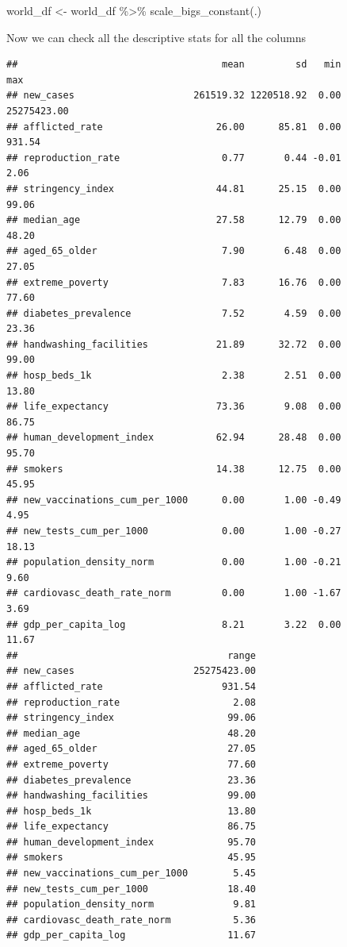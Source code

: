 \documentclass[11pt,preprint, authoryear]{elsarticle}
\numberwithin{equation}{section}
\numberwithin{figure}{section}
\numberwithin{table}{section}
\newenvironment{Shaded}{\begin{snugshade}}{\end{snugshade}}
\newcommand{\FunctionTok}[1]{\textcolor[rgb]{0.00,0.00,0.00}{#1}}
\newcommand{\NormalTok}[1]{#1}
\newcommand{\OtherTok}[1]{\textcolor[rgb]{0.56,0.35,0.01}{#1}}
\newcommand{\SpecialCharTok}[1]{\textcolor[rgb]{0.00,0.00,0.00}{#1}}
\begin{document}
\begin{Shaded}
\begin{Highlighting}[]
\NormalTok{world\_df }\OtherTok{\textless{}{-}}\NormalTok{ world\_df }\SpecialCharTok{\%\textgreater{}\%} \FunctionTok{scale\_bigs\_constant}\NormalTok{(.)}
\end{Highlighting}
\end{Shaded}

Now we can check all the descriptive stats for all the columns

\begin{verbatim}
##                                    mean         sd   min         max
## new_cases                     261519.32 1220518.92  0.00 25275423.00
## afflicted_rate                    26.00      85.81  0.00      931.54
## reproduction_rate                  0.77       0.44 -0.01        2.06
## stringency_index                  44.81      25.15  0.00       99.06
## median_age                        27.58      12.79  0.00       48.20
## aged_65_older                      7.90       6.48  0.00       27.05
## extreme_poverty                    7.83      16.76  0.00       77.60
## diabetes_prevalence                7.52       4.59  0.00       23.36
## handwashing_facilities            21.89      32.72  0.00       99.00
## hosp_beds_1k                       2.38       2.51  0.00       13.80
## life_expectancy                   73.36       9.08  0.00       86.75
## human_development_index           62.94      28.48  0.00       95.70
## smokers                           14.38      12.75  0.00       45.95
## new_vaccinations_cum_per_1000      0.00       1.00 -0.49        4.95
## new_tests_cum_per_1000             0.00       1.00 -0.27       18.13
## population_density_norm            0.00       1.00 -0.21        9.60
## cardiovasc_death_rate_norm         0.00       1.00 -1.67        3.69
## gdp_per_capita_log                 8.21       3.22  0.00       11.67
##                                     range
## new_cases                     25275423.00
## afflicted_rate                     931.54
## reproduction_rate                    2.08
## stringency_index                    99.06
## median_age                          48.20
## aged_65_older                       27.05
## extreme_poverty                     77.60
## diabetes_prevalence                 23.36
## handwashing_facilities              99.00
## hosp_beds_1k                        13.80
## life_expectancy                     86.75
## human_development_index             95.70
## smokers                             45.95
## new_vaccinations_cum_per_1000        5.45
## new_tests_cum_per_1000              18.40
## population_density_norm              9.81
## cardiovasc_death_rate_norm           5.36
## gdp_per_capita_log                  11.67
\end{verbatim}
\end{document}
